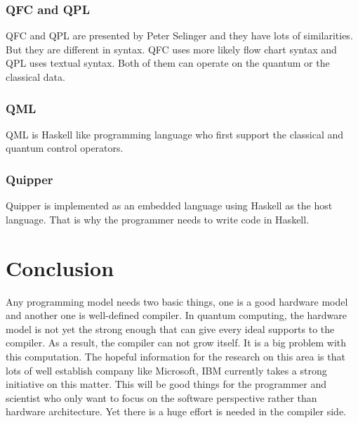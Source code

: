 \documentclass[11pt, conference, onecolumn]{IEEEtran}
\begin{document}
\subsubsection{QFC and QPL}
QFC and QPL are presented by Peter Selinger and they have lots of similarities. But they are different in syntax. QFC uses more likely flow chart syntax and QPL uses textual syntax. 
Both of them can operate on the quantum or the classical data.

\subsubsection{QML}
QML is Haskell like programming language who first support the classical and quantum control operators.

\subsubsection{Quipper}
Quipper is implemented as an embedded language using Haskell as the host language. That is why the programmer needs to write code in Haskell.

\section{Conclusion}
Any programming model needs two basic things, one is a good hardware model and another one is well-defined compiler. In quantum computing, the hardware model is not yet 
the strong enough that can give every ideal supports to the compiler. As a result, the compiler can not grow itself. It is a big problem with this computation. The hopeful information 
for the research on this area is that lots of well establish company like Microsoft, IBM currently takes a strong initiative on this matter. This will be good things for the programmer and scientist 
who only want to focus on the software perspective rather than hardware architecture. Yet there is a huge effort is needed in the compiler side.  



\end{document}

